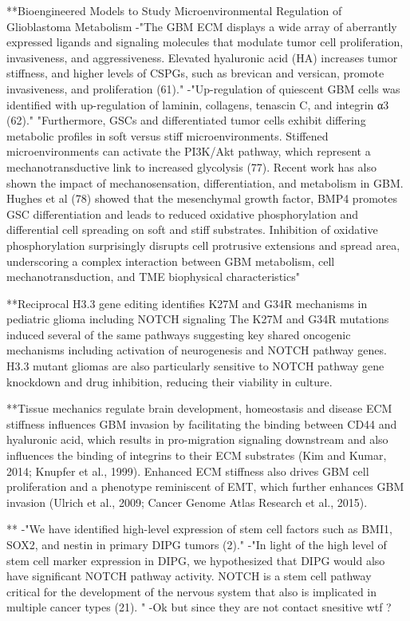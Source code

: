 \documentclass[11pt,a4paper]{article}
\begin{document}
 **Bioengineered Models to Study Microenvironmental Regulation of Glioblastoma Metabolism
 -"The GBM ECM displays a wide array of aberrantly expressed ligands and signaling molecules that modulate tumor cell proliferation, invasiveness, and aggressiveness. Elevated hyaluronic acid (HA) increases tumor stiffness, and higher levels of CSPGs, such as brevican and versican, promote invasiveness, and proliferation (61)."
 -"Up-regulation of quiescent GBM cells was identified with up-regulation of laminin, collagens, tenascin C, and integrin α3 (62)."
"Furthermore, GSCs and differentiated tumor cells exhibit differing metabolic profiles in soft versus stiff microenvironments. Stiffened microenvironments can activate the PI3K/Akt pathway, which represent a mechanotransductive link to increased glycolysis (77). Recent work has also shown the impact of mechanosensation, differentiation, and metabolism in GBM. Hughes et al (78) showed that the mesenchymal growth factor, BMP4 promotes GSC differentiation and leads to reduced oxidative phosphorylation and differential cell spreading on soft and stiff substrates. Inhibition of oxidative phosphorylation surprisingly disrupts cell protrusive extensions and spread area, underscoring a complex interaction between GBM metabolism, cell mechanotransduction, and TME biophysical characteristics"

**Reciprocal H3.3 gene editing identifies K27M and G34R mechanisms in pediatric glioma including NOTCH signaling 
 The K27M and G34R mutations induced several of the same pathways suggesting key shared oncogenic mechanisms including activation of neurogenesis and NOTCH pathway genes. 
H3.3 mutant gliomas are also particularly sensitive to NOTCH pathway gene knockdown and drug inhibition, reducing their viability in culture.

**Tissue mechanics regulate brain development, homeostasis and disease
ECM stiffness influences GBM invasion by facilitating the binding between CD44 and hyaluronic acid, which results in pro-migration signaling downstream and also influences the binding of integrins to their ECM substrates (Kim and Kumar, 2014; Knupfer et al., 1999). Enhanced ECM stiffness also drives GBM cell proliferation and a phenotype reminiscent of EMT, which further enhances GBM invasion (Ulrich et al., 2009; Cancer Genome Atlas Research et al., 2015). 

**
-"We have identified high-level expression of stem cell factors such as BMI1, SOX2, and nestin in primary DIPG tumors (2)."
-"In light of the high level of stem cell marker expression in DIPG, we hypothesized that DIPG would also have significant NOTCH pathway activity. NOTCH is a stem cell pathway critical for the development of the nervous system that also is implicated in multiple cancer types (21). "
-Ok but since they are not  contact snesitive wtf ?
\end{document}
